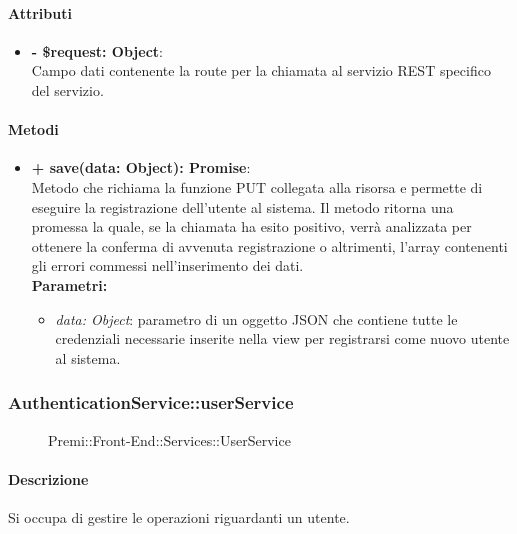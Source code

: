 		\paragraph{Attributi}
		\begin{itemize}
			\item \textbf{- \$request: Object}:\\
			Campo dati contenente la route per la chiamata al servizio REST specifico del servizio.
		\end{itemize}	
		
		\paragraph{Metodi}
		\begin{itemize}
			\item \textbf{+ save(data: Object): Promise}:\\
			Metodo che richiama la funzione PUT collegata alla risorsa e permette di eseguire la registrazione dell'utente al sistema. Il metodo ritorna una promessa la quale, se la chiamata ha esito positivo, verrà analizzata per ottenere la conferma di avvenuta registrazione o altrimenti, l'array contenenti gli errori commessi nell'inserimento dei dati.\\
			\textbf{Parametri:}\\
			\begin{itemize}
				\item \textit{data: Object}: parametro di un oggetto JSON che contiene tutte le credenziali necessarie inserite nella view per registrarsi come nuovo utente al sistema.
			\end{itemize}
		\end{itemize}
		
		
		\subsubsection{AuthenticationService::userService}
		\begin{figure}[h]
			\centering
			\caption[Premi::Front-End::Services::UserService]{Premi::Front-End::Services::UserService}
		\end{figure}
		
		\paragraph{Descrizione}
		Si occupa di gestire le operazioni riguardanti un utente.
		
